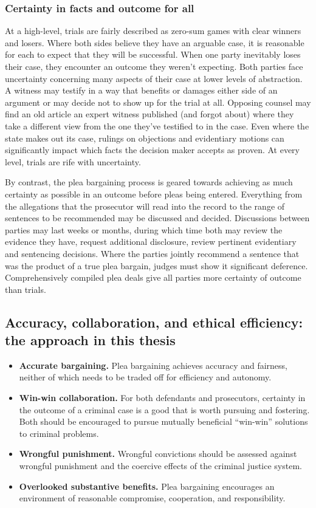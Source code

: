 \subsubsection{Certainty in facts and outcome for all}

At a high-level, trials are fairly described as zero-sum games with clear winners and losers. Where both sides believe they have an arguable case, it is reasonable for each to expect that they will be successful. When one party inevitably loses their case, they encounter an outcome they weren't expecting. Both parties face uncertainty concerning many aspects of their case at lower levels of abstraction. A witness may testify in a way that benefits or damages either side of an argument or may decide not to show up for the trial at all. Opposing counsel may find an old article an expert witness published (and forgot about) where they take a different view from the one they've testified to in the case. Even where the state makes out its case, rulings on objections and evidentiary motions can significantly impact which facts the decision maker accepts as proven. At every level, trials are rife with uncertainty.

By contrast, the plea bargaining process is geared towards achieving as much certainty as possible in an outcome before pleas being entered. Everything from the allegations that the prosecutor will read into the record to the range of sentences to be recommended may be discussed and decided. Discussions between parties may last weeks or months, during which time both may review the evidence they have, request additional disclosure, review pertinent evidentiary and sentencing decisions. Where the parties jointly recommend a sentence that was the product of a true plea bargain, judges must show it significant deference. Comprehensively compiled plea deals give all parties more certainty of outcome than trials.

\subsection{Accuracy, collaboration, and ethical efficiency: the approach in this thesis}

\begin{itemize}
\item \textbf{Accurate bargaining.} Plea bargaining achieves accuracy and fairness, neither of which needs to be traded off for efficiency and autonomy.
\item \textbf{Win-win collaboration.} For both defendants and prosecutors, certainty in the outcome of a criminal case is a good that is worth pursuing and fostering. Both should be encouraged to pursue mutually beneficial ``win-win'' solutions to criminal problems.
\item \textbf{Wrongful punishment.} Wrongful convictions should be assessed against wrongful punishment and the coercive effects of the criminal justice system.
\item \textbf{Overlooked substantive benefits.} Plea bargaining encourages an environment of reasonable compromise, cooperation, and responsibility.
\end{itemize}

